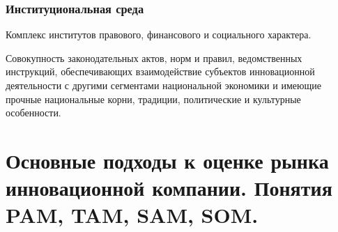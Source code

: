 \documentclass[11pt]{article}
\theoremstyle{plain} %
\theoremstyle{definition} %
\theoremstyle{remark} %
\begin{document}
	\subsubsection{Институциональная среда}
	Комплекс институтов правового,
	финансового и социального
	характера.

	\vspace{1em}
	Совокупность
	законодательных актов, норм и правил, ведомственных инструкций,
	обеспечивающих взаимодействие субъектов инновационной деятельности с другими сегментами национальной экономики и имеющие прочные национальные корни, традиции, политические и культурные особенности.

\newpage

\section{Основные подходы к оценке рынка инновационной компании. Понятия PAM, TAM, SAM, SOM.}\label{erste}
\end{document}
